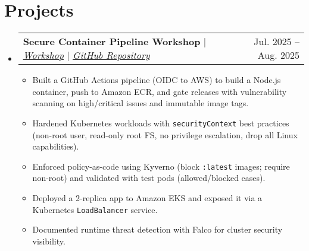 \documentclass[a4paper,12pt]{article}
\makeatletter
\newcommand{\resumeItem}[1]{
  \item\small{
    {#1 \vspace{-2pt}}
  }
}
\newcommand{\resumeProjectHeading}[2]{
    \item
    \begin{tabular*}{0.97\textwidth}{l@{\extracolsep{\fill}}r}
      \small#1 & #2 \\
    \end{tabular*}\vspace{-7pt}
}
\newcommand{\resumeSubHeadingListStart}{\begin{itemize}[leftmargin=0.15in, label={}]}
\newcommand{\resumeSubHeadingListEnd}{\end{itemize}}
\newcommand{\resumeItemListStart}{\begin{itemize}}
\newcommand{\resumeItemListEnd}{\end{itemize}\vspace{-5pt}}
\makeatother
\begin{document}
\section{Projects}
\resumeSubHeadingListStart
\resumeProjectHeading
{\textbf{Secure Container Pipeline Workshop} $|$ \emph{\href{https://powoftech.github.io/secure-container-pipeline-workshop/}{\underline{Workshop}}} $|$ \emph{\href{https://github.com/powoftech/secure-container-pipeline-workshop}{\underline{GitHub Repository}}}}{Jul. 2025 -- Aug. 2025}
\resumeItemListStart
\resumeItem{Built a GitHub Actions pipeline (OIDC to AWS) to build a Node.js container, push to Amazon ECR, and gate releases with vulnerability scanning on high/critical issues and immutable image tags.}
\resumeItem{Hardened Kubernetes workloads with \texttt{securityContext} best practices (non-root user, read-only root FS, no privilege escalation, drop all Linux capabilities).}
\resumeItem{Enforced policy-as-code using Kyverno (block \texttt{:latest} images; require non-root) and validated with test pods (allowed/blocked cases).}
\resumeItem{Deployed a 2-replica app to Amazon EKS and exposed it via a Kubernetes \texttt{LoadBalancer} service.}
\resumeItem{Documented runtime threat detection with Falco for cluster security visibility.}
\resumeItemListEnd
{}
\resumeSubHeadingListEnd

\end{document}
